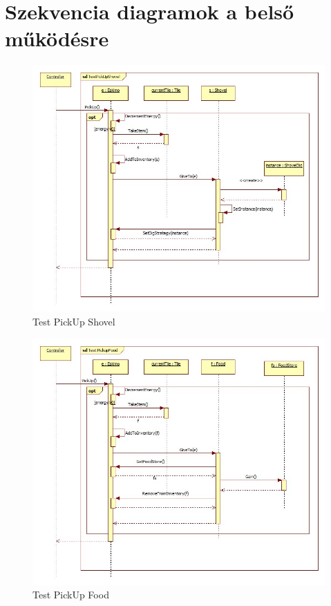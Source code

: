 \pagebreak
\section{Szekvencia diagramok a belső működésre}

\begin{figure}[H]
	\begin{center}
		\includegraphics[width=17cm]{chapters/chapter05/diagrams/TestPickUpShovel.jpg}
		\caption{Test PickUp Shovel}
		\label{fig:Test PickUp Shovel}
	\end{center}
\end{figure}

\begin{figure}[H]
	\begin{center}
		\includegraphics[width=17cm]{chapters/chapter05/diagrams/TestPickUpFood.jpg}
		\caption{Test PickUp Food}
		\label{fig:Test PickUp Food}
	\end{center}
\end{figure}

